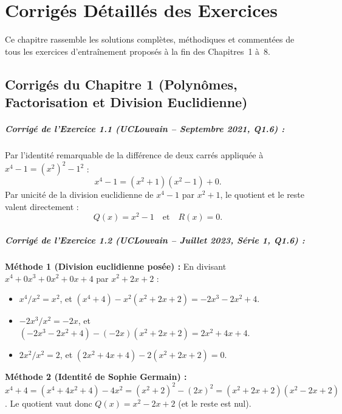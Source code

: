 \chapter{Corrigés Détaillés des Exercices}

Ce chapitre rassemble les solutions complètes, méthodiques et commentées de tous les exercices d'entraînement proposés à la fin des Chapitres~1 à~8.

\section{Corrigés du Chapitre 1 (Polynômes, Factorisation et Division Euclidienne)}

\paragraph{Corrigé de l'Exercice 1.1 (UCLouvain -- Septembre 2021, Q1.6) :}
Par l'identité remarquable de la différence de deux carrés appliquée à $x^4 - 1 = (x^2)^2 - 1^2$ :
\[
    x^4 - 1 = (x^2 + 1)(x^2 - 1) + 0.
\]
Par unicité de la division euclidienne de $x^4 - 1$ par $x^2 + 1$, le quotient et le reste valent directement :
\[
    \boxed{Q(x) = x^2 - 1 \quad \text{et} \quad R(x) = 0}.
\]

\paragraph{Corrigé de l'Exercice 1.2 (UCLouvain -- Juillet 2023, Série 1, Q1.6) :}
\textbf{Méthode 1 (Division euclidienne posée) :} En divisant $x^4 + 0x^3 + 0x^2 + 0x + 4$ par $x^2 + 2x + 2$ :
\begin{itemize}
    \item $x^4 / x^2 = x^2$, et $(x^4 + 4) - x^2(x^2 + 2x + 2) = -2x^3 - 2x^2 + 4$.
    \item $-2x^3 / x^2 = -2x$, et $(-2x^3 - 2x^2 + 4) - (-2x)(x^2 + 2x + 2) = 2x^2 + 4x + 4$.
    \item $2x^2 / x^2 = 2$, et $(2x^2 + 4x + 4) - 2(x^2 + 2x + 2) = 0$.
\end{itemize}
\textbf{Méthode 2 (Identité de Sophie Germain) :} $x^4 + 4 = (x^4 + 4x^2 + 4) - 4x^2 = (x^2 + 2)^2 - (2x)^2 = (x^2 + 2x + 2)(x^2 - 2x + 2)$.
Le quotient vaut donc $\boxed{Q(x) = x^2 - 2x + 2}$ (et le reste est nul).

